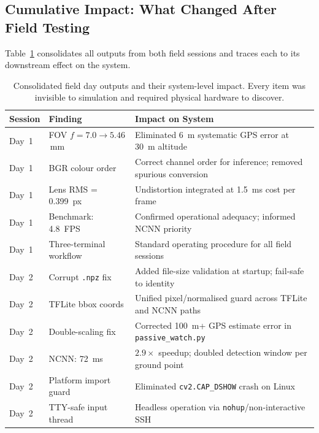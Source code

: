 \subsection{Cumulative Impact: What Changed After Field Testing}\label{sec:field-impact}

Table~\ref{tab:field-outputs} consolidates all outputs from both field sessions and traces each to its downstream effect on the system.

\begin{table}[H]
\centering
\caption{Consolidated field day outputs and their system-level impact.  Every item was invisible to simulation and required physical hardware to discover.}
\label{tab:field-outputs}
\small
\begin{tabularx}{\linewidth}{@{}lp{3.2cm}X@{}}
\toprule
\textbf{Session} & \textbf{Finding} & \textbf{Impact on System} \\
\midrule
Day~1 & FOV $f{=}7.0{\to}5.46$\,mm & Eliminated \SI{6}{\metre} systematic GPS error at \SI{30}{\metre} altitude \\
Day~1 & BGR colour order & Correct channel order for inference; removed spurious conversion \\
Day~1 & Lens RMS = \SI{0.399}{px} & Undistortion integrated at \SI{1.5}{\milli\second} cost per frame \\
Day~1 & Benchmark: \SI{4.8}{FPS} & Confirmed operational adequacy; informed NCNN priority \\
Day~1 & Three-terminal workflow & Standard operating procedure for all field sessions \\
\addlinespace
Day~2 & Corrupt \texttt{.npz} fix & Added file-size validation at startup; fail-safe to identity \\
Day~2 & TFLite bbox coords & Unified pixel/normalised guard across TFLite and NCNN paths \\
Day~2 & Double-scaling fix & Corrected \SI{100}{\metre}+ GPS estimate error in \texttt{passive\_watch.py} \\
Day~2 & NCNN: \SI{72}{\milli\second} & $2.9\times$ speedup; doubled detection window per ground point \\
Day~2 & Platform import guard & Eliminated \texttt{cv2.CAP\_DSHOW} crash on Linux \\
Day~2 & TTY-safe input thread & Headless operation via \texttt{nohup}/non-interactive SSH \\
\bottomrule
\end{tabularx}
\end{table}

